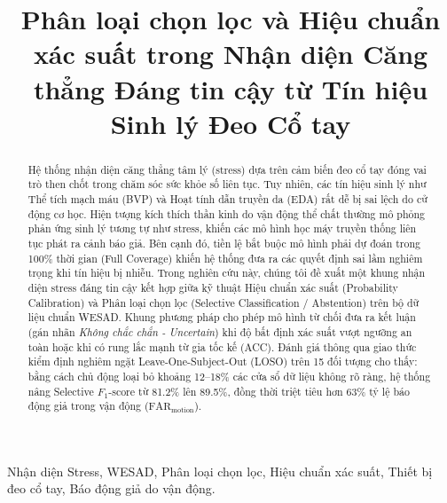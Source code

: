 \documentclass[conference]{IEEEtran}
\begin{document}
\title{Phân loại chọn lọc và Hiệu chuẩn xác suất trong Nhận diện Căng thẳng Đáng tin cậy từ Tín hiệu Sinh lý Đeo Cổ tay}

\author{
}

\maketitle

\begin{abstract}
Hệ thống nhận diện căng thẳng tâm lý (stress) dựa trên cảm biến đeo cổ tay đóng vai trò then chốt trong chăm sóc sức khỏe số liên tục. Tuy nhiên, các tín hiệu sinh lý như Thể tích mạch máu (BVP) và Hoạt tính dẫn truyền da (EDA) rất dễ bị sai lệch do cử động cơ học. Hiện tượng kích thích thần kinh do vận động thể chất thường mô phỏng phản ứng sinh lý tương tự như stress, khiến các mô hình học máy truyền thống liên tục phát ra cảnh báo giả. Bên cạnh đó, tiền lệ bắt buộc mô hình phải dự đoán trong 100\% thời gian (Full Coverage) khiến hệ thống đưa ra các quyết định sai lầm nghiêm trọng khi tín hiệu bị nhiễu. Trong nghiên cứu này, chúng tôi đề xuất một khung nhận diện stress đáng tin cậy kết hợp giữa kỹ thuật Hiệu chuẩn xác suất (Probability Calibration) và Phân loại chọn lọc (Selective Classification / Abstention) trên bộ dữ liệu chuẩn WESAD. Khung phương pháp cho phép mô hình từ chối đưa ra kết luận (gán nhãn \textit{Không chắc chắn - Uncertain}) khi độ bất định xác suất vượt ngưỡng an toàn hoặc khi có rung lắc mạnh từ gia tốc kế (ACC). Đánh giá thông qua giao thức kiểm định nghiêm ngặt Leave-One-Subject-Out (LOSO) trên 15 đối tượng cho thấy: bằng cách chủ động loại bỏ khoảng 12--18\% các cửa sổ dữ liệu không rõ ràng, hệ thống nâng Selective $F_1$-score từ 81.2\% lên 89.5\%, đồng thời triệt tiêu hơn 63\% tỷ lệ báo động giả trong vận động ($\text{FAR}_{\text{motion}}$).
\end{abstract}

\begin{IEEEkeywords}
Nhận diện Stress, WESAD, Phân loại chọn lọc, Hiệu chuẩn xác suất, Thiết bị đeo cổ tay, Báo động giả do vận động.
\end{IEEEkeywords}
\end{document}
